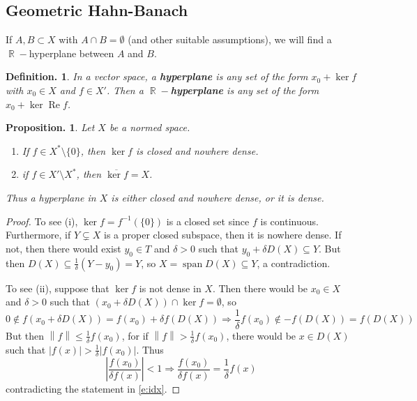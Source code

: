 \documentclass[11pt, a4paper]{memoir}
\DeclareMathOperator{\R}{{\mathbb{R}}}
\newcommand{\norm}[1]{\ensuremath{\left\lVert#1\right\rVert}}
\theoremstyle{change}
\newtheorem{proposition}[theorem]{Proposition.}
\theoremstyle{plain}
\theoremstyle{nonumberplain}
\newtheorem{definition}{Definition.}
\newtheorem{proof}{Proof}
\DeclareMathOperator{\spn}{span}
\renewcommand{\Re}{\ensuremath{\operatorname{Re}}}
\numberwithin{equation}{section}
\begin{document}
\subsection{Geometric Hahn-Banach}
If $A,B\subset X$ with $A\cap B=\emptyset$ (and other suitable assumptions), we will find a $\R-$hyperplane between $A$ and $B$.
\begin{definition}
    In a vector space, a \textbf{hyperplane} is any set of the form $x_0+\ker f$ with $x_0\in X$ and $f\in X'$.
    Then a \textbf{$\R-$hyperplane} is any set of the form $x_0+\ker\Re f$.
\end{definition}
\begin{proposition}
    Let $X$ be a normed space.
    \begin{enumerate}[nl,r]
        \item If $f\in X^*\setminus\{0\}$, then $\ker f$ is closed and nowhere dense.
        \item if $f\in X'\setminus X^*$, then $\overline{\ker f}=X$.
    \end{enumerate}
    Thus a hyperplane in $X$ is either closed and nowhere dense, or it is dense.
\end{proposition}
\begin{proof}
    To see (i), $\ker f=f^{-1}(\{0\})$ is a closed set since $f$ is continuous.
    Furthermore, if $Y\subsetneq X$ is a proper closed subspace, then it is nowhere dense.
    If not, then there would exist $y_0\in T$ and $\delta>0$ such that $y_0+\delta D(X)\subseteq Y$.
    But then $D(X)\subseteq\frac{1}{\delta}(Y-y_0)=Y$, so $X=\spn D(X)\subseteq Y$, a contradiction.

    To see (ii), suppose that $\ker f$ is not dense in $X$.
    Then there would be $x_0\in X$ and $\delta>0$ such that $(x_0+\delta D(X))\cap \ker f=\emptyset$, so
    \begin{equation}\label{e:idx}
        0\notin f(x_0+\delta D(X))=f(x_0)+\delta f(D(X))\Longrightarrow \frac{1}{\delta}f(x_0)\notin -f(D(X))=f(D(X))
    \end{equation}
    But then $\norm{f}\leq\frac{1}{\delta}f(x_0)$, for if $\norm{f}>\frac{1}{\delta}f(x_0)$, there would be $x\in D(X)$ such that $|f(x)|>\frac{1}{\delta}|f(x_0)|$.
    Thus
    \begin{equation*}
        \left\lvert\frac{f(x_0)}{\delta f(x)}\right\rvert<1\Longrightarrow \frac{f(x_0)}{\delta f(x)}=\frac{1}{\delta}f(x)
    \end{equation*}
    contradicting the statement in \cref{e:idx}.
\end{proof}
\end{document}
